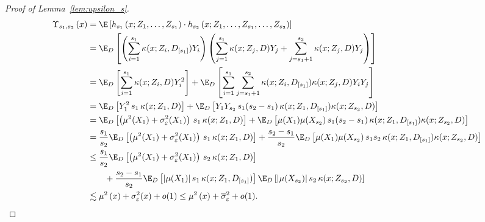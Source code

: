 \begin{proof}[Proof of Lemma~\ref{lem:upsilon_s}]
	\begin{equation}
		\begin{aligned}
			\Upsilon_{s_1, s_2}\left(x\right)
			 & = \E\left[h_{s_1}\left(x; Z_1, \ldots,  Z_{s_1}\right) \cdot
			h_{s_2}\left(x; Z_1, \ldots,Z_{s_1}, \ldots, Z_{s_2}\right)\right]                                                                             \\
			 & = \E_{D}\left[
				\left(\sum_{i = 1}^{s_1} \kappa(x; Z_{i}, D_{[s_1]})Y_{i}\right)
				\left(\sum_{j = 1}^{s_1}\kappa(x; Z_j, D)Y_j + \sum_{j = s_1 + 1}^{s_2}\kappa(x; Z_j, D)Y_j\right)
			\right]                                                                                                                                                                            \\
			 & = \E_{D}\left[\sum_{i = 1}^{s_1} \kappa(x; Z_{i}, D) Y_{i}^2\right]
			+ \E_{D}\left[\sum_{i = 1}^{s_1}\sum_{j = s_1 + 1}^{s_2}\kappa(x; Z_{i}, D_{[s_1]})\kappa(x; Z_j, D) Y_{i} Y_j\right]                              \\
			 & = \E_{D}\left[Y_1^2 \, s_1 \, \kappa(x; Z_1, D)\right]
			+ \E_{D}\left[Y_{1} Y_{s_2} \, s_1 (s_2 - s_1) \, \kappa(x; Z_1, D_{[s_1]})\kappa(x; Z_{s_2}, D)\right]                                        \\
			 & = \E_{D}\left[\left(\mu^2(X_1) + \sigma^2_{\varepsilon}(X_1)\right) \, s_1 \, \kappa(x; Z_1, D)\right]
			+ \E_{D}\left[\mu(X_1) \mu(X_{s_2}) \, s_1 (s_2 - s_1) \, \kappa(x; Z_1, D_{[s_1]})\kappa(x; Z_{s_2}, D)\right]              \\
			 & = \frac{s_1}{s_2}\E_{D}\left[\left(\mu^2(X_1) + \sigma^2_{\varepsilon}(X_1)\right) \, s_1 \, \kappa(x; Z_1, D)\right]
			+ \frac{s_2 - s_1}{s_2}\E_{D}\left[\mu(X_1) \mu(X_{s_2}) \, s_1 s_2 \, \kappa(x; Z_1, D_{[s_1]})\kappa(x; Z_{s_2}, D)\right] \\
			 & \leq \frac{s_1}{s_2} \E_{D}\left[\left(\mu^2(X_1) + \sigma^2_{\varepsilon}(X_1)\right) \, s_2 \, \kappa(x; Z_1, D)\right]                   \\
			 & \quad \quad + \frac{s_2 - s_1}{s_2}\E_{D}\left[|\mu(X_1)| \, s_1 \, \kappa(x; Z_1, D_{[s_1]})\right]
			\E_{D}\left[|\mu(X_{s_2})| \, s_2 \, \kappa(x; Z_{s_2}, D)\right]                                                                                       \\
			 & \lesssim \mu^{2}\left(x\right) + \sigma^2_{\varepsilon}(x) + o(1)
			\leq \mu^{2}\left(x\right) + \overline{\sigma}^2_{\varepsilon} + o(1).
		\end{aligned}
	\end{equation}
\end{proof}

